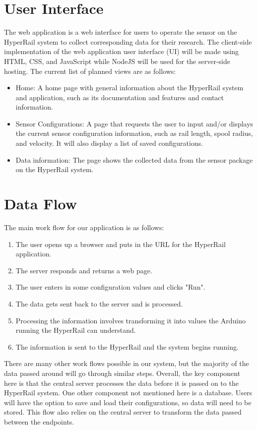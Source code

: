 \documentclass[onecolumn, draftclsnofoot,10pt, compsoc]{IEEEtran}
\begin{document}
\section{User Interface}
The web application is a web interface for users to operate the sensor on the HyperRail system to collect corresponding data for their research. The client-side implementation of the web application user interface (UI) will be made using HTML, CSS, and JavaScript while NodeJS will be used for the server-side hosting. The current list of planned views are as follows:
\begin{itemize}
    \item Home: A home page with general information about the HyperRail system and application, such as its documentation and features and contact information.
    \item Sensor Configurations: A page that requests the user to input and/or displays the current sensor configuration information, such as rail length, spool radius, and velocity. It will also display a list of saved configurations.
    \item Data information: The page shows the collected data from the sensor package on the HyperRail system.
\end{itemize}


\section{Data Flow}

    The main work flow for our application is as follows:
    \begin{enumerate}
        \item The user opens up a browser and puts in the URL for the HyperRail application.
        \item The server responds and returns a web page.
        \item The user enters in some configuration values and clicks "Run".
        \item The data gets sent back to the server and is processed.
        \item Processing the information involves transforming it into values the Arduino running the HyperRail can understand.
        \item The information is sent to the HyperRail and the system begins running.
    \end{enumerate}
    There are many other work flows possible in our system, but the majority of the data passed around will go through similar steps. Overall, the key component here is that the central server processes the data before it is passed on to the HyperRail system. One other component not mentioned here is a database. Users will have the option to save and load their configurations, so data will need to be stored. This flow also relies on the central server to transform the data passed between the endpoints.
    
\end{document}

